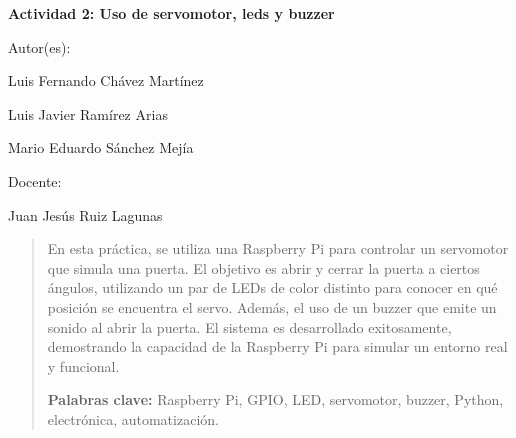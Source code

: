\begin{center}
	\vspace*{2cm}
	
	\Large\textbf{Actividad 2: Uso de servomotor, leds y buzzer}
	
	\vspace{1.5cm}
	
	Autor(es):
	
	\vspace{0.5cm}
	
	Luis Fernando Chávez Martínez
	
	Luis Javier Ramírez Arias
	
	Mario Eduardo Sánchez Mejía
	
	
	\vspace{1.5cm}
	
	Docente:
	
	\vspace{0.5cm}
	
	
	Juan Jesús Ruiz Lagunas
	
	\vspace{0.5cm}
	
	\begin{abstract}
		\noindent
		\justifying
		En esta práctica, se utiliza una Raspberry Pi para controlar un servomotor que simula una puerta. El objetivo es abrir y cerrar la puerta a ciertos ángulos, utilizando un par de LEDs de color distinto para conocer en qué posición se encuentra el servo. Además, el uso de un buzzer que emite un sonido al abrir la puerta. El sistema es desarrollado exitosamente, demostrando la capacidad de la Raspberry Pi para simular un entorno real y funcional.
		
		\vspace{0.5cm}
		\noindent
		\textbf{Palabras clave:} Raspberry Pi, GPIO, LED, servomotor, buzzer, Python, electrónica, automatización.
	\end{abstract}
\end{center}

\clearpage
{}